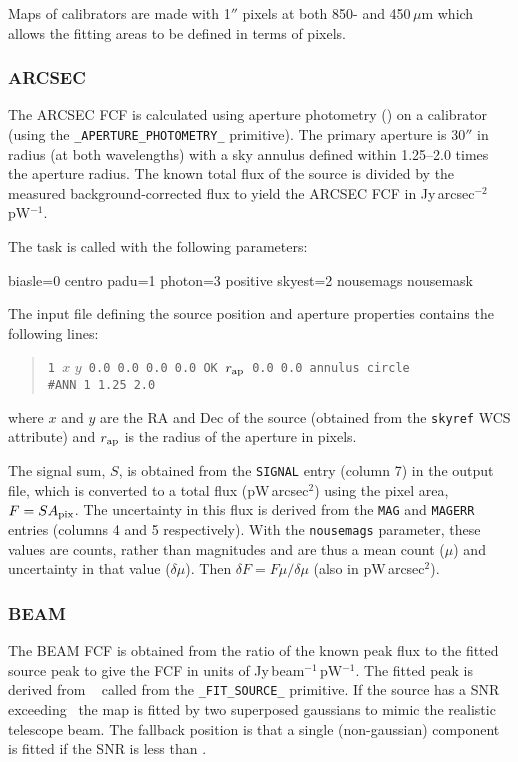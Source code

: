 Maps of calibrators are made with 1$''$ pixels at both 850- and
450\,$\mu$m which allows the fitting areas to be defined in terms of pixels.

\subsubsection{ARCSEC}

The ARCSEC FCF is calculated using aperture photometry
() on a calibrator (using the
\verb+_APERTURE_PHOTOMETRY_+ primitive). The primary aperture is
30$''$ in radius (at both wavelengths) with a sky annulus defined
within 1.25--2.0 times the aperture radius. The known total flux of
the source is divided by the measured background-corrected flux to
yield the ARCSEC FCF in Jy\,arcsec$^{-2}$\,pW$^{-1}$.

The  task is called with the following parameters:
\begin{terminalv}
biasle=0 centro padu=1 photon=3 positive skyest=2 nousemags nousemask
\end{terminalv}
The input file defining the source position and aperture properties
contains the following lines:
\begin{quote}
\verb+1 +$x$ $y$\verb+ 0.0 0.0 0.0 0.0 OK +$r_{\rm ap}$\verb+ 0.0 0.0 annulus circle+\\
\verb+#ANN 1 1.25 2.0+
\end{quote}
where $x$ and $y$ are the RA and Dec of the source (obtained from the
\verb+skyref+ WCS attribute) and $r_{\rm ap}$ is the radius of the
aperture in pixels.

The signal sum, $S$, is obtained from the \verb+SIGNAL+ entry (column
7) in the output file, which is converted to a total flux
(pW\,arcsec$^2$) using the pixel area, $F = S A_{\rm pix}$. The
uncertainty in this flux is derived from the \verb+MAG+ and
\verb+MAGERR+ entries (columns 4 and 5 respectively). With the
\verb+nousemags+ parameter, these values are counts, rather than
magnitudes and are thus a mean count ($\mu$) and uncertainty in that
value ($\delta \mu$). Then $\delta F = F \mu/\delta\mu$ (also in
pW\,arcsec$^2$).

\subsubsection{BEAM}

The BEAM FCF is obtained from the ratio of the known peak flux to the
fitted source peak to give the FCF in units of
Jy\,beam$^{-1}$\,pW$^{-1}$. The fitted peak is derived from \KAPPA\
 called from the \verb+_FIT_SOURCE_+ primitive. If the
source has a SNR exceeding \snrmin\ the map is fitted by two
superposed gaussians to mimic the realistic telescope beam. The
fallback position is that a single (non-gaussian) component is fitted
if the SNR is less than \snrmin.

